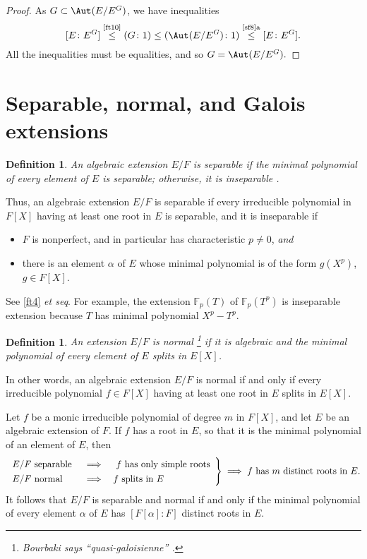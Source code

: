 \documentclass[a4paper,11pt,final,openany]{memoir}
\newtheorem{definition}[X]{Definition}
\theoremstyle{nonumberplain}
\newtheorem{proof}{Proof.}
\begin{document}
\begin{proof}
\noindent As $G\subset\Aut(E/E^{G})$, we have inequalities
\[
\lbrack E\colon E^{G}]\overset{\text{\ref{ft10}}}{\leq}(G\colon1)\leq
(\Aut(E/E^{G})\colon1)\overset{\text{\ref{sf8}a}}{\leq}[E\colon E^{G}].
\]
All the inequalities must be equalities, and so $G=\Aut(E/E^{G}).$
\end{proof}

\section{Separable, normal, and Galois extensions}

\begin{definition}
\label{ft10m}An algebraic extension $E/F$ is \emph{separable\/}%
if the minimal polynomial of every element of $E$ is separable; otherwise, it
is \emph{inseparable}%
%
.
\end{definition}

Thus, an algebraic extension $E/F$ is separable if every irreducible
polynomial in $F[X]$ having at least one root in $E$ is separable, and it is
inseparable if

\begin{itemize}
\item $F$ is nonperfect, and in particular has characteristic $p\neq0$,
\textit{and }

\item there is an element $\alpha$ of $E$ whose minimal polynomial is of the
form $g(X^{p})$, $g\in F[X]$.
\end{itemize}

\noindent See \ref{ft4} \textit{et seq}. For example, the extension
$\mathbb{F}_{p}(T)$ of $\mathbb{F}_{p}(T^{p})$ is inseparable extension
because $T$ has minimal polynomial $X^{p}-T^{p}$.

\begin{definition}
\label{ft10n}An extension $E/F$ is \emph{normal\/}%
%
\footnote{Bourbaki says \textquotedblleft quasi-galoisienne\textquotedblright%
.} if it is algebraic and the minimal polynomial of every element of $E$
splits in $E[X]$.
\end{definition}

In other words, an algebraic extension $E/F$ is normal if and only if every
irreducible polynomial $f\in F[X]$ having at least one root in $E$ splits in
$E[X]$.

Let $f$ be a monic irreducible polynomial of degree $m$ in $F[X]$, and let $E$
be an algebraic extension of $F$. If $f$ has a root in $E$, so that it is the
minimal polynomial of an element of $E$, then
\[
\renewcommand{\arraystretch}{1.3}\left.
\begin{array}
[c]{lcl}%
E/F\text{\ separable } & \implies & \text{\ }f\text{\ has only simple roots}\\
E/F\text{\ normal } & \implies & f\text{\ splits in }E
\end{array}
\right\}  \implies f\text{\ has }m\text{\ distinct roots in }E.
\]
It follows that $E/F$ is separable and normal if and only if the minimal
polynomial of every element $\alpha$ of $E$ has $[F[\alpha]\colon F]$ distinct
roots in $E$.
\end{document}
